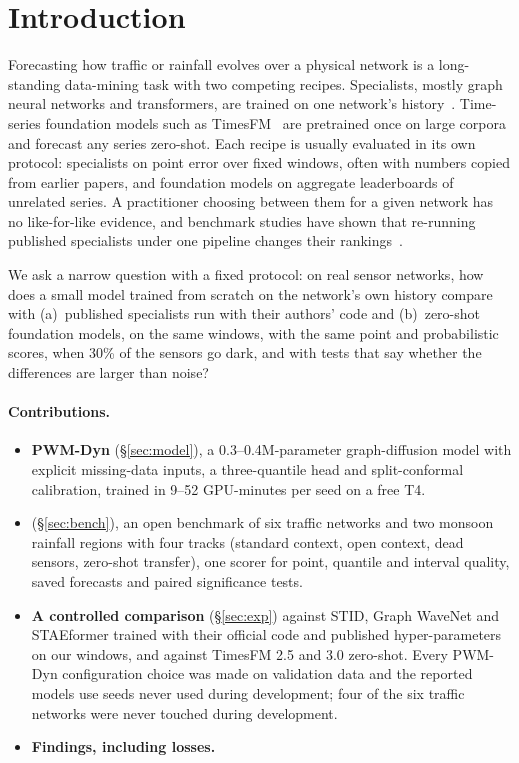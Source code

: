 \section{Introduction}
\sloppy

Forecasting how traffic or rainfall evolves over a physical network is a long-standing data-mining task with two
competing recipes. Specialists, mostly graph neural networks and transformers, are trained on one network's
history~\citep{li2018dcrnn,wu2019graphwavenet,shao2022stid,liu2023staeformer}. Time-series foundation models such
as TimesFM~\citep{das2024timesfm} are pretrained once on large corpora and forecast any series zero-shot. Each
recipe is usually evaluated in its own protocol: specialists on point error over fixed windows, often with numbers
copied from earlier papers, and foundation models on aggregate leaderboards of unrelated series. A practitioner
choosing between them for a given network has no like-for-like evidence, and benchmark studies have shown that
re-running published specialists under one pipeline changes their rankings~\citep{shao2024basicts}.

We ask a narrow question with a fixed protocol: on real sensor networks, how does a small model trained from
scratch on the network's own history compare with (a)~published specialists run with their authors' code and
(b)~zero-shot foundation models, on the same windows, with the same point and probabilistic scores, when 30\% of
the sensors go dark, and with tests that say whether the differences are larger than noise?

\paragraph{Contributions.}
\begin{itemize}
\item \textbf{PWM-Dyn} (\S\ref{sec:model}), a 0.3--0.4M-parameter graph-diffusion model with explicit missing-data
inputs, a three-quantile head and split-conformal calibration, trained in 9--52 GPU-minutes per seed on a free T4.
\item \textbf{\benchname{}} (\S\ref{sec:bench}), an open benchmark of six traffic networks and two monsoon rainfall
regions with four tracks (standard context, open context, dead sensors, zero-shot transfer), one scorer for point,
quantile and interval quality, saved forecasts and paired significance tests.
\item \textbf{A controlled comparison} (\S\ref{sec:exp}) against STID, Graph WaveNet and STAEformer trained with
their official code and published hyper-parameters on our windows, and against TimesFM 2.5 and 3.0 zero-shot. Every
PWM-Dyn configuration choice was made on validation data and the reported models use seeds never used during
development; four of the six traffic networks were never touched during development.
\item \textbf{Findings, including losses.} 
\end{itemize}

